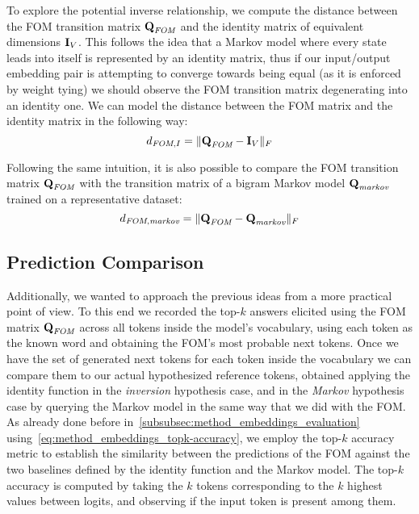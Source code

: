 To explore the potential inverse relationship, we compute the distance between the FOM transition matrix $\bm{\mathbf{Q}}_{\textit{FOM}}$ and the identity matrix of equivalent dimensions $\bm{\mathbf{I}}_V$.
This follows the idea that a Markov model where every state leads into itself is represented by an identity matrix, thus if our input/output embedding pair is attempting to converge towards being equal (as it is enforced by weight tying) we should observe the FOM transition matrix degenerating into an identity one.
We can model the distance between the FOM matrix and the identity matrix in the following way:
\begin{equation}
    \label{eq:method_fom_fom-i-comp}
    d_{\textit{FOM},I} = \| \bm{\mathbf{Q}}_{\textit{FOM}} - \bm{\mathbf{I}}_V \|_F
\end{equation}

Following the same intuition, it is also possible to compare the FOM transition matrix $\bm{\mathbf{Q}}_{\textit{FOM}}$ with the transition matrix of a bigram Markov model $\bm{\mathbf{Q}}_{\textit{markov}}$ trained on a representative dataset:
\begin{equation}
    \label{eq:method_fom_fom-markov-comp}
    d_{\textit{FOM},\textit{markov}} = \| \bm{\mathbf{Q}}_{\textit{FOM}} - \bm{\mathbf{Q}}_{\textit{markov}} \|_F
\end{equation}

\subsection{Prediction Comparison}\label{ssec:method_fom_pred}

Additionally, we wanted to approach the previous ideas from a more practical point of view.
To this end we recorded the top-$k$ answers elicited using the FOM matrix $\bm{\mathbf{Q}}_{\textit{FOM}}$ across all tokens inside the model's vocabulary, using each token as the known word and obtaining the FOM's most probable next tokens.
Once we have the set of generated next tokens for each token inside the vocabulary we can compare them to our actual hypothesized reference tokens, obtained applying the identity function in the \emph{inversion} hypothesis case, and in the \emph{Markov} hypothesis case by querying the Markov model in the same way that we did with the FOM\@.
As already done before in~\cref{subsubsec:method_embeddings_evaluation} using~\cref{eq:method_embeddings_topk-accuracy}, we employ the top-$k$ accuracy metric to establish the similarity between the predictions of the FOM against the two baselines defined by the identity function and the Markov model.
The top-$k$ accuracy is computed by taking the $k$ tokens corresponding to the $k$ highest values between logits, and observing if the input token is present among them.

